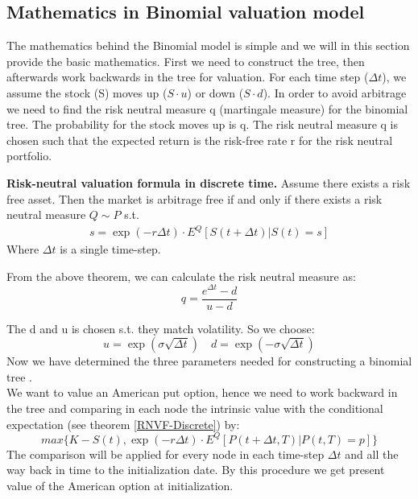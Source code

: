 
\subsection{Mathematics in Binomial valuation model}
The mathematics behind the Binomial model is simple and we will in this section provide the basic mathematics. First we need to construct the tree, then afterwards work backwards in the tree for valuation. For each time step ($\Delta t$), we assume the stock (S) moves up ($S \cdot u$) or down ($S \cdot d$). In order to avoid arbitrage we need to find the risk neutral measure q (martingale measure) for the binomial tree.  The probability for the stock moves up is q. The risk neutral measure q is chosen such that the expected return is the risk-free rate r for the risk neutral portfolio.

\begin{theorem}\label{RNVF-Discrete}
\textbf{Risk-neutral valuation formula in discrete time. }
Assume there exists a risk free asset. Then the market is arbitrage free if and only if there exists a risk neutral measure $Q \sim P$ s.t.
\begin{align}
s= \exp(- r \Delta t) \cdot E^Q[S(t+\Delta t)|S(t)=s] 
\end{align}
Where $\Delta t$ is a single time-step.
\end{theorem}
From the above theorem, we can calculate the risk neutral measure as:\\
$$q=\frac{e^{\Delta t}-d}{u-d}$$

The d and u is chosen s.t. they match volatility. So we choose:
$$u= \exp(\sigma \sqrt{\Delta t}) \quad d= \exp(-\sigma \sqrt{\Delta t})$$
Now we have determined the three parameters needed for constructing a binomial tree \parencite{CRR} \parencite{Hull} \parencite{finKont}.\\

We want to value an American put option, hence we need to work backward in the tree and comparing in each node the intrinsic value with the conditional expectation (see theorem \ref{RNVF-Discrete}) by:
\begin{equation}
max\{ K-S(t), \exp(- r \Delta t) \cdot E^Q[P(t+\Delta t,T)|P(t,T)=p] \}
\end{equation}
The comparison will be applied for every node in each time-step $\Delta t$  and all the way back in time to the initialization date. By this procedure we get present value of the American option at initialization.

